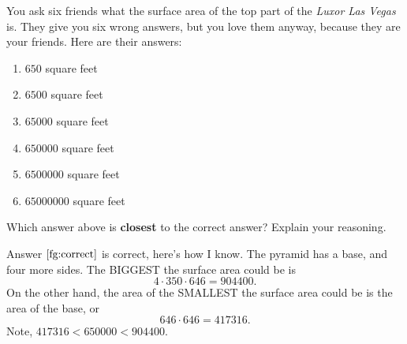 \documentclass[handout,nooutcomes,noauthor,hints]{ximera}
\begin{document}
 \begin{question}%
    You ask six friends what the surface area of the top part of the
    \textit{Luxor Las Vegas} is. They give you six wrong answers, but
    you love them anyway, because they are your friends. Here are
    their answers:
    \begin{enumerate}
    \item $650$ square feet
    \item $6500$ square feet
    \item $65000$ square feet
    \item\label{fg:correct} $650000$ square feet
    \item $6500000$ square feet
    \item $65000000$ square feet
    \end{enumerate}
      Which answer above is \textbf{closest} to the correct answer?
      Explain your reasoning.
      \begin{freeResponse}
        Answer $\ref{fg:correct}$ is correct, here's how I know. The pyramid has a
        base, and four more sides. The BIGGEST the surface area could
        be is
        \[
        4\cdot 350\cdot 646 = 904400.
        \]
        On the other hand, the area of the SMALLEST the surface area could be is
        the area of the base, or
        \[
        646\cdot 646 = 417316.
        \]
        Note, $417316 < 650000 <  904400$.        
      \end{freeResponse}
\end{question}
\end{document}
